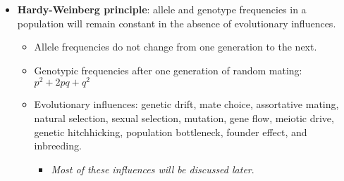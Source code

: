 \documentclass[12pt,a4paper]{article}
\begin{document}
\begin{itemize}
\begin{itemize}
        \end{itemize}
    \item \textbf{Hardy-Weinberg principle}: allele and genotype {\color{o-Sun}frequencies} in a population will remain {\color{o-Sun}constant} in the {\color{o-Sun}absence of evolutionary influences}.
        \begin{itemize}
            \item Allele frequencies do not change from one generation to the next.
            \item Genotypic frequencies after one generation of random mating: \(p^2 + 2pq + q^2\)
            \item Evolutionary influences: genetic drift, mate choice, assortative mating, natural selection, sexual selection, mutation, gene flow, meiotic drive, genetic hitchhicking, population bottleneck, founder effect, and inbreeding.
                \begin{itemize}
                    \item \textit{Most of these influences will be discussed later}.
                \end{itemize}
        \end{itemize}
\end{itemize}
\end{document}

